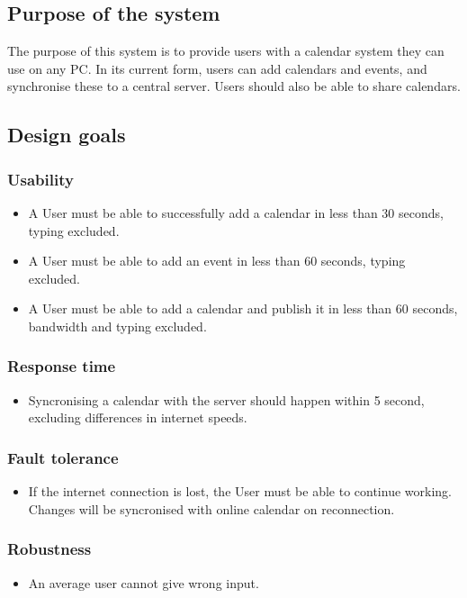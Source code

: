 \documentclass[10pt]{report}
\numberwithin{equation}{section} %
\numberwithin{figure}{section} %
\numberwithin{table}{section} %
\begin{document}
\subsection{Purpose of the system}
The purpose of this system is to provide users with a calendar system they can
use on any PC. In its current form, users can add calendars and events, and
synchronise these to a central server. Users should also be able to share
calendars.

\subsection{Design goals}
\subsubsection{Usability}
\begin{itemize}
\item A User must be able to successfully add a calendar in less than 30
  seconds, typing excluded.
\item A User must be able to add an event in less than 60 seconds, typing
  excluded.
\item A User must be able to add a calendar and publish it in less than 60
  seconds, bandwidth and typing excluded.
\end{itemize}
\subsubsection{Response time}
\begin{itemize}
\item Syncronising a calendar with the server should happen within 5 second,
  excluding differences in internet speeds.
\end{itemize}
\subsubsection{Fault tolerance}
\begin{itemize}
\item If the internet connection is lost, the User must be able to continue
  working. Changes will be syncronised with online calendar on reconnection.
\end{itemize}
\subsubsection{Robustness}
\begin{itemize}
\item An average user cannot give wrong input.
\end{itemize}
\end{document}
